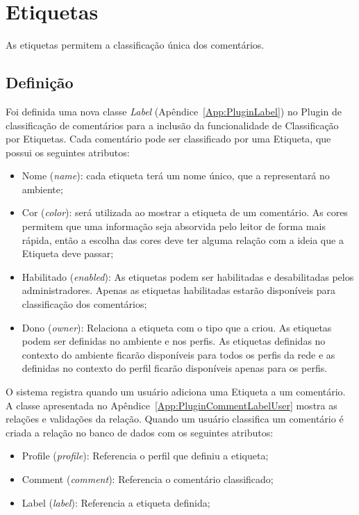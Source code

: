 \documentclass[11pt]{article}
\begin{document}
\section{Etiquetas}

As etiquetas permitem a classificação única dos comentários.

\subsection{Definição}

Foi definida uma nova classe {\it Label}
(Apêndice~\ref{App:PluginLabel}) no Plugin de classificação de
comentários para a inclusão da funcionalidade de Classificação por
Etiquetas. Cada comentário pode ser classificado por uma Etiqueta, que possui os
seguintes atributos:
\begin{itemize}
  \item Nome ({\it name}): cada etiqueta terá um nome único, que a representará no
ambiente;
  \item Cor ({\it color}): será utilizada ao mostrar a etiqueta de um comentário. As
cores permitem que uma informação seja absorvida pelo leitor de forma
mais rápida, então a escolha das cores deve ter alguma relação com a
ideia que a Etiqueta deve passar;
  \item Habilitado ({\it enabled}): As etiquetas podem ser habilitadas e desabilitadas
pelos administradores. Apenas as etiquetas habilitadas estarão
disponíveis para classificação dos comentários;
  \item Dono ({\it owner}): Relaciona a etiqueta com o tipo que a criou.
As etiquetas podem ser definidas no ambiente e
nos perfis. As etiquetas definidas no contexto do ambiente ficarão
disponíveis para todos os perfis da rede e as definidas no contexto do
perfil ficarão disponíveis apenas para os perfis.
\end{itemize}

O sistema registra quando um usuário adiciona uma Etiqueta a um
comentário. A classe apresentada no
Apêndice~\ref{App:PluginCommentLabelUser} mostra as relações e
validações da relação. Quando um usuário classifica um comentário é
criada a relação no banco de dados com os seguintes atributos:
\begin{itemize}
  \item Profile ({\it profile}): Referencia o perfil que definiu a
etiqueta;
  \item Comment ({\it comment}): Referencia o comentário classificado;
  \item Label ({\it label}): Referencia a etiqueta definida;
\end{itemize}
\end{document}
